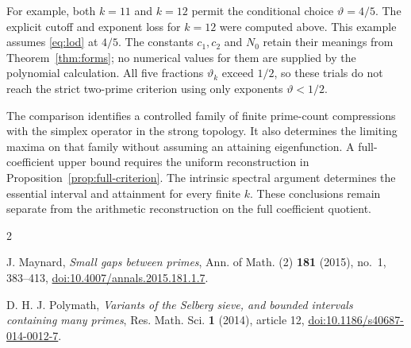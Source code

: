 \documentclass[11pt]{article}
\begin{document}
For example, both $k=11$ and $k=12$ permit the conditional choice
$\vartheta=4/5$.  The explicit cutoff and exponent loss for $k=12$
were computed above.
This example assumes \eqref{eq:lod} at $4/5$.
The constants $c_1,c_2$ and $N_0$ retain their meanings from
Theorem~\ref{thm:forms}; no numerical values for them are supplied by the
polynomial calculation.
All five fractions $\vartheta_k$ exceed $1/2$, so these trials do not reach
the strict two-prime criterion using only exponents $\vartheta<1/2$.

The comparison identifies a controlled family of finite prime-count
compressions with the simplex operator in the strong topology.
It also determines the limiting maxima on that family without assuming an
attaining eigenfunction.  A full-coefficient upper bound requires the
uniform reconstruction in Proposition~\ref{prop:full-criterion}.
The intrinsic spectral argument determines the essential interval and
attainment for every finite $k$.  These conclusions remain separate from the
arithmetic reconstruction on the full coefficient quotient.









\begin{thebibliography}{2}

J. Maynard,
\emph{Small gaps between primes},
Ann. of Math. (2) \textbf{181} (2015), no.~1, 383--413,
\href{https://doi.org/10.4007/annals.2015.181.1.7}
{doi:10.4007/annals.2015.181.1.7}.

D. H. J. Polymath,
\emph{Variants of the Selberg sieve, and bounded intervals containing many primes},
Res. Math. Sci. \textbf{1} (2014), article 12,
\href{https://doi.org/10.1186/s40687-014-0012-7}
{doi:10.1186/s40687-014-0012-7}.

\end{thebibliography}
\end{document}

